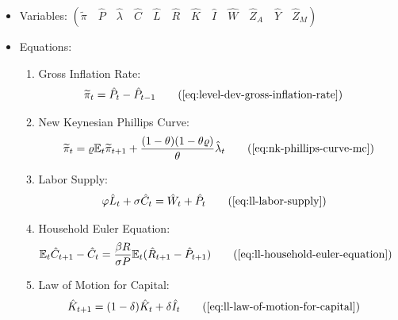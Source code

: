 \documentclass[
thesis.tex
]{subfiles}
\begin{document}
	{\singlespacing
		
		\begin{itemize}
			
			\item Variables: \( \left( \tilde{\pi} \quad \hat{P} \quad \hat{\lambda} \quad \hat{C} \quad \hat{L} \quad \hat{R} \quad \hat{K} \quad \hat{I} \quad \hat{W} \quad \hat{Z}_A \quad \hat{Y} \quad \hat{Z}_M \right) \)
			
			\item Equations:
			
			\begin{enumerate}
				
				\item Gross Inflation Rate:
				\begin{align}
					\widetilde{\pi}_t &= \hat{P}_t - \hat{P}_{t-1}
					\tag{\ref{eq:level-dev-gross-inflation-rate}}
				\end{align}
				
				\item New Keynesian Phillips Curve:
				\begin{align}
					\widetilde{\pi}_t = \varrho \E \widetilde{\pi}_{t+1} + \frac{(1-\theta) (1- \theta \varrho)}{\theta} \hat{\lambda}_t
					\tag{\ref{eq:nk-phillips-curve-mc}}
				\end{align}
				
				\item Labor Supply:
				\begin{align}
					\varphi \hat{L}_t + \sigma \hat{C}_t &= \hat{W}_t + \hat{P}_t
					\tag{\ref{eq:ll-labor-supply}}
				\end{align}
				
				\item Household Euler Equation:
				\begin{align}
					\E \hat{C}_{t+1} - \hat{C}_t &= \frac{\beta R}{\sigma P} \E(\hat{R}_{t+1} - \hat{P}_{t+1})
					\tag{\ref{eq:ll-household-euler-equation}}
				\end{align}
				
				\item Law of Motion for Capital:
				\begin{align}
					\hat{K}_{t+1} &= (1-\delta)\hat{K}_t + \delta \hat{I}_t
					\tag{\ref{eq:ll-law-of-motion-for-capital}}
				\end{align}
				
				

\end{enumerate}
\end{itemize}}
\end{document}
